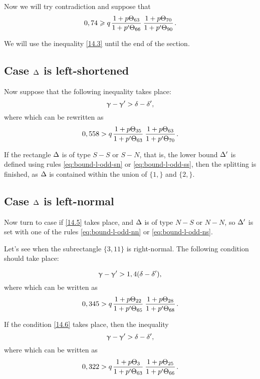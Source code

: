Now we will try contradiction and suppose that
\begin{equation}\label{14.3}
	0,74 \geqslant q \up{63}{66} \up{70}{90}.
\end{equation}

We will use the inequality \ref{14.3} until the end of the section.


\subsection{Case $\Delta$ is left-shortened}

Now suppose that the following inequality takes place:
\begin{equation*}
	\upgamma - \upgamma' > \delta - \delta',
\end{equation*}
where
which can be rewritten as
\begin{equation}\label{14.5}
	0,558 > q \up{35}{63} \up{63}{70}.
\end{equation}

If the rectangle $\Delta$ is of type $S-S$ or $S-N$,
that is, the lower bound $\Delta'$ is defined using rules \ref{eq:bound-l-odd-sn} or \ref{eq:bound-l-odd-ss},
then the splitting is finished, as $\Delta$ is contained within the union of $\{1,\}$ and $\{2,\}$.


\subsection{Case $\Delta$ is left-normal}

Now turn to case if \ref{14.5} takes place,
and $\Delta$ is of type $N-S$ or $N-N$,
so $\Delta'$ is set with one of the rules \ref{eq:bound-l-odd-nn} or \ref{eq:bound-l-odd-ns}.

Let's see when the subrectangle $\{3, 11\}$ is right-normal.
The following condition should take place:


\begin{equation*}
	\upgamma - \upgamma' > 1,4 (\delta - \delta'),
\end{equation*}
where
which can be written as
\begin{equation}\label{14.6}
	0,345 > q \up{22}{65} \up{28}{68}.
\end{equation}

If the condition \ref{14.6} takes place, then
the inequality
\begin{equation*}
	\upgamma - \upgamma' > \delta - \delta',
\end{equation*}
where
which can be written as
\begin{equation}\label{14.7}
	0,322 > q \up{3}{63} \up{25}{66}.
\end{equation}

